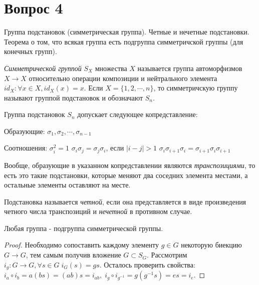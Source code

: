 \section{Вопрос 4}

Группа подстановок (симметрическая группа). Четные и нечетные подстановки. 
Теорема о том, что всякая группа есть подгруппа симметричской группы (для конечных групп).

\begin{defn} 
  \emph{Симметрической группой} $ S_{X} $ множества $ X $ называется группа автоморфизмов $ X \rightarrow X $
  относительно операции композиции и нейтрального элемента $ id_{X} : \forall x \in X, id_{X}(x) = x $. \newline
  Если $ X = \{1, 2, \cdots, n \} $, то симметричскую группу называют группой подстановок и обозначают $ S_{n} $. 
\end{defn}

Группа подстановок $ S_{n} $ допускает следующее копредставление: \newline

Образующие: \newline
$ \sigma_{1}, \sigma_{2}, \cdots ,\sigma_{n-1} $ \newline

Соотношения: \newline
$ \sigma_{i}^{2} = 1 $ \newline
$ \sigma_{i}\sigma_{j} = \sigma_{j}\sigma_{i} $, если $ |i - j| > 1 $ \newline
$ \sigma_{i}\sigma_{i+1}\sigma_{i} = \sigma_{i+1}\sigma_{i}\sigma_{i+1} $ \newline

Вообще, образующие в указанном копредставлении являются \emph{транспозициями}, то есть это такие подстановки,
которые меняют два соседних элемента местами, а остальные элементы оставляют на месте.

\begin{defn}
  Подстановка называется \emph{четной}, если она представляется в виде произведения четного числа транспозиций и 
  \emph{нечетной} в противном случае.
\end{defn}

\begin{thm}
  Любая группа - подгруппа симметрической группы.
\end{thm}
\begin{proof}
  Необходимо сопоставить каждому элементу $ g \in G $ некоторую биекцию $ G \rightarrow G $, тем самым получив вложение $ G \subset S_{G} $.
  Рассмотрим $ i_{g} : G \rightarrow G, \forall s \in G \; i_{G}(s) = gs $. 
  Осталось проверить свойства: $ i_{a} \circ i_{b} = a(bs) = (ab)s = i_{ab}, \; i_{g} \circ i_{g^{-1}} = g(g^{-1}s) = es = i_{e} $.
\end{proof}


